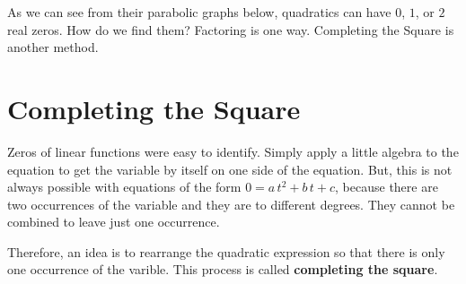\documentclass{ximera}
\begin{document}
As we can see from their parabolic graphs below, quadratics can have $0$, $1$, or $2$ real zeros.  How do we find them? Factoring is one way.  Completing the Square is another method.







\begin{image}
\end{image}
















\section{Completing the Square}

Zeros of linear functions were easy to identify.  Simply apply a little algebra to the equation to get the variable by itself on one side of the equation.  But, this is not always possible with equations of the form $0 = a \, t^2 + b \, t + c $, because there are two occurrences of the variable and they are to different degrees. They cannot be combined to leave just one occurrence.

Therefore, an idea is to rearrange the quadratic expression so that there is only one occurrence of the varible.  This process is called \textbf{completing the square}.
\end{document}
